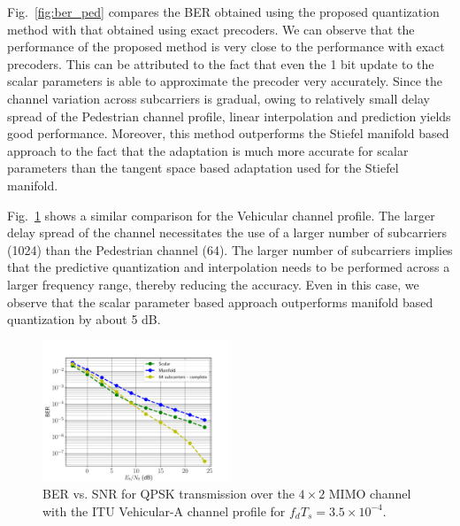 \documentclass[journal,10pt,twocolumn]{IEEEtran}
\begin{document}
Fig.~\ref{fig:ber_ped} compares the BER obtained using the proposed
quantization method with that obtained using exact precoders. We can
observe that the performance of the proposed method is very close to
the performance with exact precoders. This can be attributed to the
fact that even the 1 bit update to the scalar parameters is able to
approximate the precoder very accurately. Since the channel variation
across subcarriers is gradual, owing to relatively small delay spread
of the Pedestrian channel profile, linear interpolation and prediction
yields good performance. Moreover, this method outperforms the Stiefel
manifold based approach to the fact that the adaptation is much more
accurate for scalar parameters than the tangent space based adaptation
used for the Stiefel manifold.

Fig.~\ref{fig:ber_veh} shows a similar comparison for the Vehicular
channel profile. The larger delay spread of the channel necessitates
the use of a larger number of subcarriers (1024) than the Pedestrian
channel (64). The larger number of subcarriers implies that the
predictive quantization and interpolation needs to be performed across
a larger frequency range, thereby reducing the accuracy. Even in this
case, we observe that the scalar parameter based approach outperforms
manifold based quantization by about 5 dB.

\begin{figure}
\includegraphics[width=0.5\textwidth]{images/ber-vehicular-35e-4}
\caption{BER vs. SNR for QPSK transmission over the $4\times 2$ MIMO
  channel with the ITU Vehicular-A channel profile for $f_dT_s = 3.5\times 10^{-4}$.}
\label{fig:ber_veh}
\end{figure}


\end{document}
